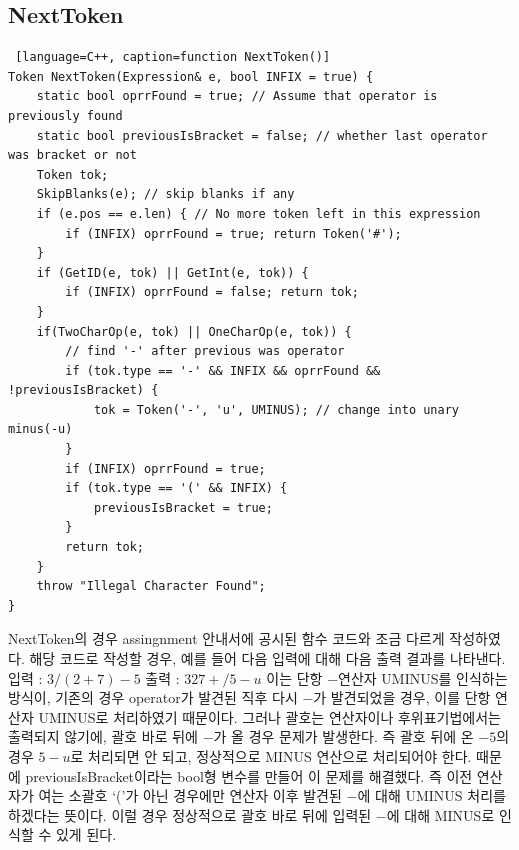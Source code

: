 \documentclass{article}
\begin{document}
\subsection{NextToken}
\begin{lstlisting} [language=C++, caption=function NextToken()]
Token NextToken(Expression& e, bool INFIX = true) {
	static bool oprrFound = true; // Assume that operator is previously found
	static bool previousIsBracket = false; // whether last operator was bracket or not
	Token tok;
	SkipBlanks(e); // skip blanks if any
	if (e.pos == e.len) { // No more token left in this expression
		if (INFIX) oprrFound = true; return Token('#');
	}
	if (GetID(e, tok) || GetInt(e, tok)) {
		if (INFIX) oprrFound = false; return tok;
	}
	if(TwoCharOp(e, tok) || OneCharOp(e, tok)) {
	    // find '-' after previous was operator 
		if (tok.type == '-' && INFIX && oprrFound && !previousIsBracket) {
			tok = Token('-', 'u', UMINUS); // change into unary minus(-u)
		}
		if (INFIX) oprrFound = true;
		if (tok.type == '(' && INFIX) {
			previousIsBracket = true;
		}
		return tok;
	}
	throw "Illegal Character Found";
}
\end{lstlisting}
NextToken의 경우 assingnment 안내서에 공시된 함수 코드와 조금 다르게 작성하였다. 해당 코드로 작성할 경우, 예를 들어 다음 입력에 대해 다음 출력 결과를 나타낸다.
입력 : $3 / (2 + 7) - 5$
출력 : $3 2 7 + / 5 -u$
이는 단항 $-$연산자 UMINUS를 인식하는 방식이, 기존의 경우 operator가 발견된 직후 다시 $-$가 발견되었을 경우, 이를 단항 연산자 UMINUS로 처리하였기 때문이다. 그러나 괄호는 연산자이나 후위표기법에서는 출력되지 않기에, 괄호 바로 뒤에 $-$가 올 경우 문제가 발생한다. 즉 괄호 뒤에 온 $-5$의 경우 $5 -u$로 처리되면 안 되고, 정상적으로 MINUS 연산으로 처리되어야 한다. 때문에 previousIsBracket이라는 bool형 변수를 만들어 이 문제를 해결했다. 즉 이전 연산자가 여는 소괄호 `('가 아닌 경우에만 연산자 이후 발견된 $-$에 대해 UMINUS 처리를 하겠다는 뜻이다. 이럴 경우 정상적으로 괄호 바로 뒤에 입력된 $-$에 대해 MINUS로 인식할 수 있게 된다.
\end{document}
